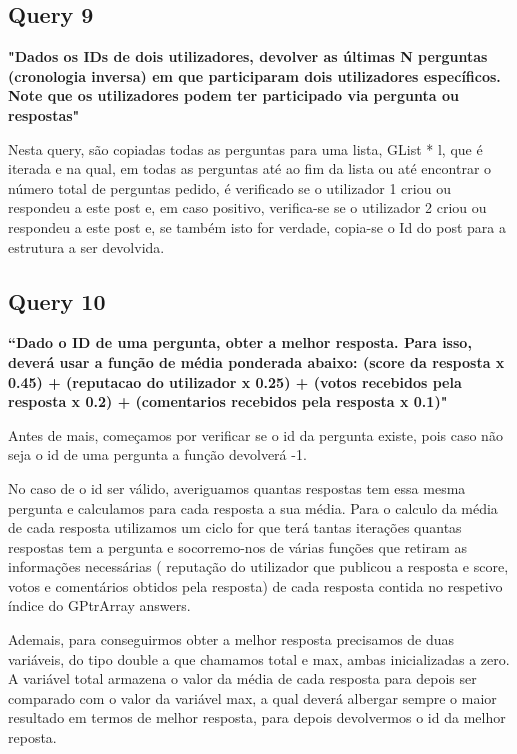\documentclass[a4paper]{report}
\begin{document}
\subsection*{Query 9}
\label{sec:query9}

\textbf{"Dados os IDs de dois utilizadores, devolver as últimas
N perguntas (cronologia inversa) em que participaram dois utilizadores específicos. 
Note que os utilizadores podem ter participado via pergunta ou respostas"}

Nesta query, são copiadas todas as perguntas para uma lista, GList * l, que é iterada
e na qual, em todas as perguntas até ao fim da lista ou até encontrar o número total de
perguntas pedido, é verificado se o utilizador 1 criou ou respondeu a este post e, em
caso positivo, verifica-se se o utilizador 2 criou ou respondeu a este post e, se
também isto for verdade, copia-se o Id do post para a estrutura a ser devolvida.



\subsection*{Query 10}
\label{sec:query10}
\textbf{“Dado o ID de uma pergunta, obter a melhor resposta.
Para isso, deverá usar a função de média ponderada abaixo: (score da resposta x 0.45)
+ (reputacao do utilizador x 0.25) + (votos recebidos pela resposta x 0.2) +
(comentarios recebidos pela resposta x 0.1)"}

Antes de mais, começamos por verificar se o id da pergunta existe, pois caso não
seja o id de uma pergunta a função devolverá -1. \par
No caso de o id ser válido, averiguamos quantas respostas tem essa mesma pergunta
e calculamos para cada resposta a sua média. Para o calculo da média de cada resposta
utilizamos um ciclo for que terá tantas iterações quantas respostas tem a pergunta e
socorremo-nos de várias funções que retiram as informações necessárias ( reputação
do utilizador que publicou a resposta e score, votos e comentários obtidos pela resposta)
de cada resposta contida no respetivo índice do GPtrArray answers. \par
Ademais, para conseguirmos obter a melhor resposta precisamos de duas variáveis,
do tipo double a que chamamos total e max, ambas inicializadas a zero. A variável total
armazena o valor da média de cada resposta para depois ser comparado com o valor da variável
max, a qual deverá albergar sempre o maior resultado em termos de melhor resposta, para
depois devolvermos o id da melhor reposta.
\end{document}
